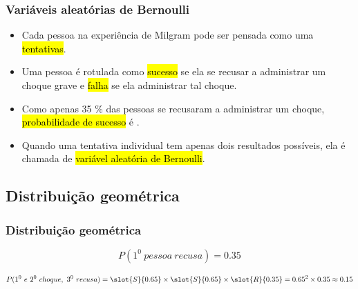 \documentclass[11pt]{beamer}
\begin{document}

\begin{frame}
\frametitle{Variáveis aleatórias de Bernoulli}

\begin{itemize}

\item Cada pessoa na experiência de Milgram pode ser pensada como uma \hl{tentativas}.

\item Uma pessoa é rotulada como \hl{sucesso} se ela se recusar a administrar um choque grave e \hl{falha} se ela administrar tal choque.

\item Como apenas 35 \% das pessoas se recusaram a administrar um choque, \hl{probabilidade de sucesso} é .

\item Quando uma tentativa individual tem apenas dois resultados possíveis, ela é chamada de \hl{variável aleatória de Bernoulli}.

\end{itemize}

\end{frame}


\subsection{Distribuição geométrica}

\begin{frame}
\frametitle{Distribuição geométrica}

{\small


\[ P(1^{0}~pessoa~recusa) = 0.35 \]

\pause

\[ P(1^{0}~e~2^{0}~choque,~3^{0}~recusa) = \slot{S}{0.65} \times \slot{S}{0.65} \times  \slot{R}{0.35} = 0.65^2 \times 0.35 \approx 0.15 \]

\pause

\soln{
\pause
\[ P(9~choque,~10^{0}~recusa) = \underbrace{\slot{S}{0.65} \times \cdots \times \slot{S}{0.65}}_{9~deste} \times  \slot{R}{0.35} = 0.65^9 \times 0.35 \approx 0.0072 \]
}
}

\end{frame}
\end{document}
